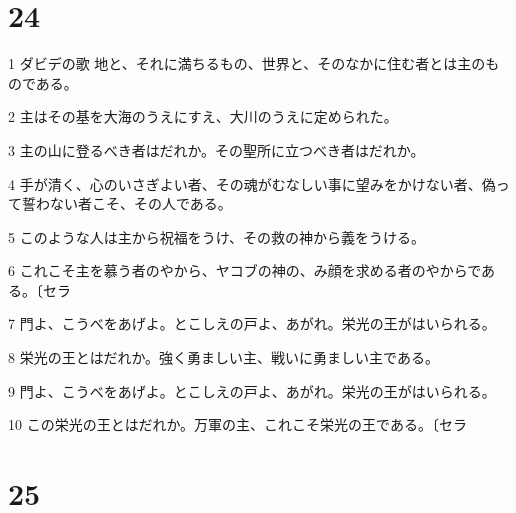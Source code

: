 \chapter{24}

\par 1 ダビデの歌 地と、それに満ちるもの、世界と、そのなかに住む者とは主のものである。
\par 2 主はその基を大海のうえにすえ、大川のうえに定められた。
\par 3 主の山に登るべき者はだれか。その聖所に立つべき者はだれか。
\par 4 手が清く、心のいさぎよい者、その魂がむなしい事に望みをかけない者、偽って誓わない者こそ、その人である。
\par 5 このような人は主から祝福をうけ、その救の神から義をうける。
\par 6 これこそ主を慕う者のやから、ヤコブの神の、み顔を求める者のやからである。〔セラ
\par 7 門よ、こうべをあげよ。とこしえの戸よ、あがれ。栄光の王がはいられる。
\par 8 栄光の王とはだれか。強く勇ましい主、戦いに勇ましい主である。
\par 9 門よ、こうべをあげよ。とこしえの戸よ、あがれ。栄光の王がはいられる。
\par 10 この栄光の王とはだれか。万軍の主、これこそ栄光の王である。〔セラ

\chapter{25}

